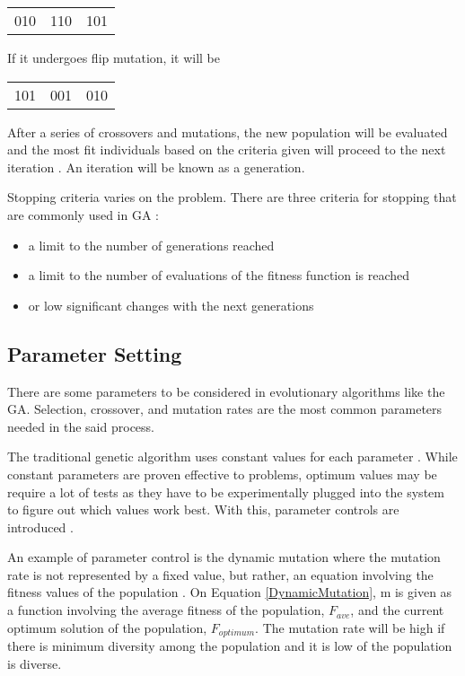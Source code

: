 \begin{center}
	\begin{tabular}{ c c c }
		010 & 110 & 101 \\     
	\end{tabular}
\end{center}

If it undergoes flip mutation, it will be 

\begin{center}
	\begin{tabular}{ c c c }
		101 & 001 & 010 \\     
	\end{tabular}
\end{center}

\hfill \par 

\hfill \par
\indent \indent After a series of crossovers and mutations, the new population will be evaluated and the most fit individuals based on the criteria given will proceed to the next iteration \cite{gen2007genetic}. An iteration will be known as a generation. \par 

Stopping criteria varies on the problem. There are three criteria for stopping that are commonly used in GA \cite{safe2004stopping}:
\begin{itemize}
	\item{a limit to the number of generations reached}
	\item{a limit to the number of evaluations of the fitness function is reached}
	\item{or low significant changes with the next generations}
\end{itemize}

\subsection{Parameter Setting}
There are some parameters to be considered in evolutionary algorithms like the GA. Selection, crossover, and mutation rates are the most common parameters needed in the said process. \par

The traditional genetic algorithm uses constant values for each parameter \cite{de1975analysis}. While constant parameters are proven effective to problems, optimum values may be require a lot of tests as they have to be experimentally plugged into the system to figure out which values work best. With this, parameter controls are introduced \cite{eiben1999parameter}. \par 
An example of parameter control is the dynamic mutation where the mutation rate is not represented by a fixed value, but rather, an equation involving the fitness values of the population  \cite{xu2018application}. On Equation \ref{DynamicMutation}, m is given as a function involving the average fitness of the population, $F_{ave}$, and the current optimum solution of the population, $F_{optimum}$. The mutation rate will be high if there is minimum diversity among the population and it is low of the population is diverse.

